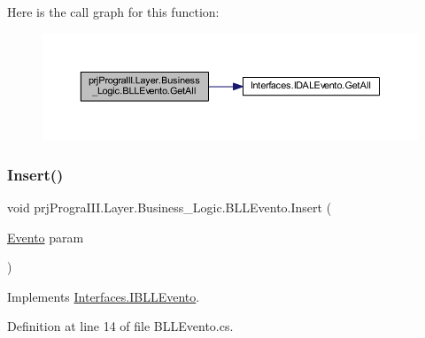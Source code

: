 Here is the call graph for this function\+:
\nopagebreak
\begin{figure}[H]
\begin{center}
\leavevmode
\includegraphics[width=350pt]{classprj_progra_i_i_i_1_1_layer_1_1_business___logic_1_1_b_l_l_evento_a5b9114ece4753c247a3ad365ca543da2_cgraph}
\end{center}
\end{figure}
\hypertarget{classprj_progra_i_i_i_1_1_layer_1_1_business___logic_1_1_b_l_l_evento_a9e31720e59b580db4bff3b1ab7d3e284}{}\label{classprj_progra_i_i_i_1_1_layer_1_1_business___logic_1_1_b_l_l_evento_a9e31720e59b580db4bff3b1ab7d3e284} 
\subsubsection{\texorpdfstring{Insert()}{Insert()}}
{\footnotesize\ttfamily void prj\+Progra\+I\+I\+I.\+Layer.\+Business\+\_\+\+Logic.\+B\+L\+L\+Evento.\+Insert (\begin{DoxyParamCaption}\item[{\hyperlink{classprj_progra_i_i_i_1_1_layer_1_1_entities_1_1_evento}{Evento}}]{param }\end{DoxyParamCaption})}



Implements \hyperlink{interface_interfaces_1_1_i_b_l_l_evento_ad26c4dba0bce0ce649b1e68e21cc194a}{Interfaces.\+I\+B\+L\+L\+Evento}.



Definition at line 14 of file B\+L\+L\+Evento.\+cs.

